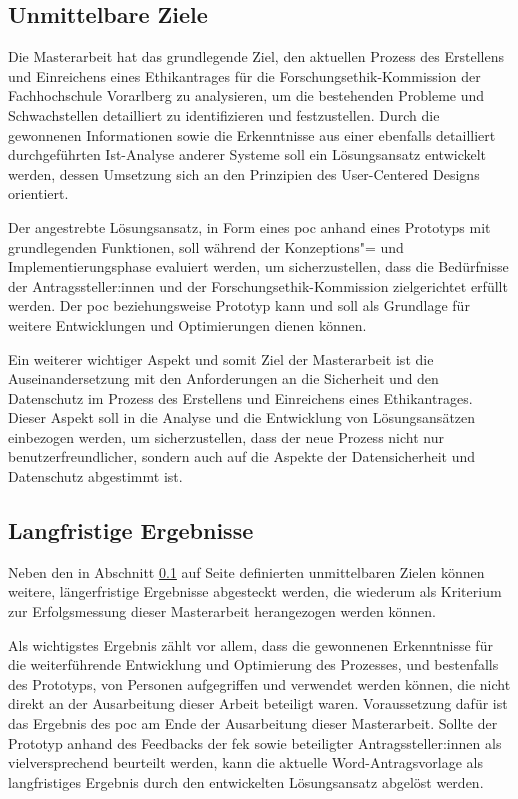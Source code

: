 \documentclass[a4paper,12pt,twoside]{scrreprt}
\begin{document}
\subsection{Unmittelbare Ziele}
\label{sub-sec:unmittelbare-ziele}

Die Masterarbeit hat das grundlegende Ziel, den aktuellen Prozess des Erstellens und Einreichens eines Ethikantrages für die Forschungsethik-Kommission der Fachhochschule Vorarlberg zu analysieren, um die bestehenden Probleme und Schwachstellen detailliert zu identifizieren und festzustellen. Durch die gewonnenen Informationen sowie die Erkenntnisse aus einer ebenfalls detailliert durchgeführten Ist-Analyse anderer Systeme soll ein Lösungsansatz entwickelt werden, dessen Umsetzung sich an den Prinzipien des User-Centered Designs orientiert.

Der angestrebte Lösungsansatz, in Form eines \ac{poc} anhand eines Prototyps mit grundlegenden Funktionen, soll während der Konzeptions"= und Implementierungsphase evaluiert werden, um sicherzustellen, dass die Bedürfnisse der Antragssteller:innen und der Forschungsethik-Kommission zielgerichtet erfüllt werden. Der \ac{poc} beziehungsweise Prototyp kann und soll als Grundlage für weitere Entwicklungen und Optimierungen dienen können.

Ein weiterer wichtiger Aspekt und somit Ziel der Masterarbeit ist die Auseinandersetzung mit den Anforderungen an die Sicherheit und den Datenschutz im Prozess des Erstellens und Einreichens eines Ethikantrages. Dieser Aspekt soll in die Analyse und die Entwicklung von Lösungsansätzen einbezogen werden, um sicherzustellen, dass der neue Prozess nicht nur benutzerfreundlicher, sondern auch auf die Aspekte der Datensicherheit und Datenschutz abgestimmt ist.

\subsection{Langfristige Ergebnisse}
\label{sub-sec:langfristige-ergebnisse}

Neben den in Abschnitt \ref{sub-sec:unmittelbare-ziele} auf Seite \pageref{sub-sec:unmittelbare-ziele} definierten unmittelbaren Zielen können weitere, längerfristige Ergebnisse abgesteckt werden, die wiederum als Kriterium zur Erfolgsmessung dieser Masterarbeit herangezogen werden können.

Als wichtigstes Ergebnis zählt vor allem, dass die gewonnenen Erkenntnisse für die weiterführende Entwicklung und Optimierung des Prozesses, und bestenfalls des Prototyps, von Personen aufgegriffen und verwendet werden können, die nicht direkt an der Ausarbeitung dieser Arbeit beteiligt waren. Voraussetzung dafür ist das Ergebnis des \ac{poc} am Ende der Ausarbeitung dieser Masterarbeit. Sollte der Prototyp anhand des Feedbacks der \acl{fek} sowie beteiligter Antragssteller:innen als vielversprechend beurteilt werden, kann die aktuelle Word-Antragsvorlage als langfristiges Ergebnis durch den entwickelten Lösungsansatz abgelöst werden.
\end{document}

